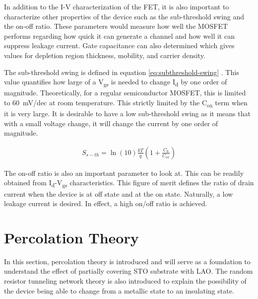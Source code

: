 \documentclass[11pt,a4paper]{report}
\begin{document}
In addition to the I-V characterization of the FET, it is also important to characterize other properties of the device such as the sub-threshold swing and the on-off ratio. These parameters would measure how well the MOSFET performs regarding how quick it can generate a channel and how well it can suppress leakage current. Gate capacitance can also determined which gives values for depletion region thickness, mobility, and carrier density.

The sub-threshold swing is defined in equation \ref{eq:subthreshold-swing} \cite{hu_2010}. This value quantifies how large of a V\textsubscript{gs} is needed to change I\textsubscript{d} by one order of magnitude. Theoretically, for a regular semiconductor MOSFET, this is limited to \SI{60}{\milli\volt}/dec at room temperature. This strictly limited by the C\textsubscript{ox} term when it is very large. It is desirable to have a low sub-threshold swing as it means that with a small voltage change, it will change the current by one order of magnitude.

\begin{align}
    S_{s-th} = \ln{(10)}\frac{kT}{q}\left(1+ \frac{C_0}{C_{ox}}\right)
    \label{eq:subthreshold-swing}
\end{align}

The on-off ratio is also an important parameter to look at. This can be readily obtained from I\textsubscript{d}-V\textsubscript{gs} characteristics.  This figure of merit defines the ratio of drain current when the device is at off state and at the on state. Naturally, a low leakage current is desired. In effect, a high on/off ratio is achieved.

\newpage

\section{Percolation Theory}
In this section, percolation theory is introduced and will serve as a foundation to understand the effect of partially covering STO substrate with LAO. The random resistor tunneling network theory is also introduced to explain the possibility of the device being able to change from a metallic state to an insulating state.
\end{document}
